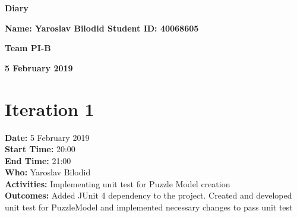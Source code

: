 \documentclass[12pt]{article}
\begin{document}
\vspace*{0.2in}
\centerline{\bf\Large Diary}

\vspace*{0.2in}
\centerline{\bf\Large Name: Yaroslav Bilodid   Student ID: 40068605}

\vspace*{0.2in}
\centerline{\bf\Large Team PI-B}

\vspace*{0.2in}
\centerline{\bf\Large 5 February 2019}

\section{Iteration 1}

{\bf Date:} 5 February 2019\\
{\bf Start Time:} 20:00\\
{\bf End Time:} 21:00 \\
{\bf Who:} Yaroslav Bilodid \\
{\bf Activities:} Implementing unit test for Puzzle Model creation\\
{\bf Outcomes:} Added JUnit 4 dependency to the project. Created and developed unit test for PuzzleModel and implemented necessary changes to pass unit test\\


\end{document}
